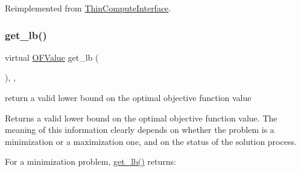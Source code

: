 Reimplemented from \mbox{\hyperlink{class_s_m_spp__di__unipi__it_1_1_thin_compute_interface_a9403da6fd83a275dfdf21ec4db71c744}{Thin\+Compute\+Interface}}.

\mbox{\label{class_s_m_spp__di__unipi__it_1_1_m_c_f_solver_a064e49220c7f623cd53edbee8313c753}} 
\subsubsection{\texorpdfstring{get\+\_\+lb()}{get\_lb()}}
{\footnotesize\ttfamily virtual \mbox{\hyperlink{class_s_m_spp__di__unipi__it_1_1_solver_ab8ce6bff9c21fdcd41e355167209301a}{O\+F\+Value}} get\+\_\+lb (\begin{DoxyParamCaption}\item[{void}]{ }\end{DoxyParamCaption})\hspace{0.3cm}{\ttfamily [inline]}, {\ttfamily [override]}, {\ttfamily [virtual]}}



return a valid lower bound on the optimal objective function value 

Returns a valid lower bound on the optimal objective function value. The meaning of this information clearly depends on whether the problem is a minimization or a maximization one, and on the status of the solution process.

For a minimization problem, \mbox{\hyperlink{class_s_m_spp__di__unipi__it_1_1_m_c_f_solver_a064e49220c7f623cd53edbee8313c753}{get\+\_\+lb()}} returns\+:


